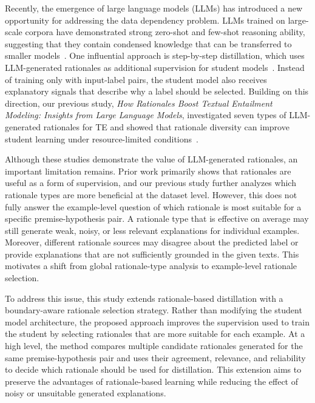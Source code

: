 Recently, the emergence of large language models (LLMs) has introduced a new opportunity for addressing the data dependency problem. LLMs trained on large-scale corpora have demonstrated strong zero-shot and few-shot reasoning ability, suggesting that they contain condensed knowledge that can be transferred to smaller models~\cite{brown2020language,wei2022chain}. One influential approach is step-by-step distillation, which uses LLM-generated rationales as additional supervision for student models~\cite{hsieh2023distilling}. Instead of training only with input-label pairs, the student model also receives explanatory signals that describe why a label should be selected. Building on this direction, our previous study, \emph{How Rationales Boost Textual Entailment Modeling: Insights from Large Language Models}, investigated seven types of LLM-generated rationales for TE and showed that rationale diversity can improve student learning under resource-limited conditions~\cite{our_rationale_te_paper}.

Although these studies demonstrate the value of LLM-generated rationales, an important limitation remains. Prior work primarily shows that rationales are useful as a form of supervision, and our previous study further analyzes which rationale types are more beneficial at the dataset level. However, this does not fully answer the example-level question of which rationale is most suitable for a specific premise-hypothesis pair. A rationale type that is effective on average may still generate weak, noisy, or less relevant explanations for individual examples. Moreover, different rationale sources may disagree about the predicted label or provide explanations that are not sufficiently grounded in the given texts. This motivates a shift from global rationale-type analysis to example-level rationale selection.

To address this issue, this study extends rationale-based distillation with a boundary-aware rationale selection strategy. Rather than modifying the student model architecture, the proposed approach improves the supervision used to train the student by selecting rationales that are more suitable for each example. At a high level, the method compares multiple candidate rationales generated for the same premise-hypothesis pair and uses their agreement, relevance, and reliability to decide which rationale should be used for distillation. This extension aims to preserve the advantages of rationale-based learning while reducing the effect of noisy or unsuitable generated explanations.

